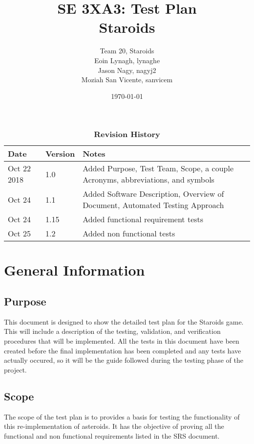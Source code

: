 \documentclass[12pt, titlepage]{article}
\title{SE 3XA3: Test Plan\\Staroids}
\author{Team 20, Staroids
		\\ Eoin Lynagh, lynaghe
		\\ Jason Nagy, nagyj2
		\\ Moziah San Vicente, sanvicem
}
\date{\today}
\begin{document}
\maketitle

\tableofcontents
\listoftables
\listoffigures

\begin{table}[bp]
\caption{\bf Revision History}
\begin{tabularx}{\textwidth}{p{3cm}p{2cm}X}
\toprule {\bf Date} & {\bf Version} & {\bf Notes}\\
\midrule
Oct 22 2018 & 1.0 & Added Purpose, Test Team, Scope, a couple Acronyms, abbreviations, and symbols\\
Oct 24 & 1.1 & Added Software Description, Overview of Document, Automated Testing Approach\\
Oct 24 & 1.15 & Added functional requirement tests\\
Oct 25 & 1.2 & Added non functional tests\\
\bottomrule
\end{tabularx}
\end{table}

\newpage


\section{General Information}

\subsection{Purpose}
This document is designed to show the detailed test plan for the Staroids game. This will include a description of the testing, validation, and verification procedures that will be implemented. All the tests in this document have been created before the final implementation has been completed and any tests have actually occured, so it will be the guide followed during the testing phase of the project.

\subsection{Scope}
The scope of the test plan is to provides a basis for testing the functionality of this re-implementation of asteroids. It has the objective of proving all the functional and non functional requirements listed in the SRS document.
\end{document}
